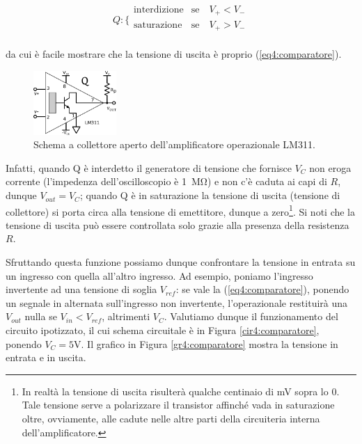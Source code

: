 \begin{equation}
Q : \bigg \{
\begin{array}{rl}
\mathrm{interdizione} & \mathrm{se} \quad V_+ < V_- \\
\mathrm{saturazione} & \mathrm{se} \quad V_+ > V_- \\
\end{array}
\label{eq4:comparatore_Q}
\end{equation}

da cui è facile mostrare che la tensione di uscita è proprio (\ref{eq4:comparatore}).

\begin{figure}
  \begin{center}
    \includegraphics[width=0.280\textwidth]{../E04/latex/c_LM311.pdf}
  \end{center}
  \caption{Schema a collettore aperto dell'amplificatore operazionale LM311.}
  \label{cir4:open_collector}
\end{figure}

Infatti, quando Q è interdetto il generatore di tensione che fornisce $V_C$ non eroga corrente (l'impedenza dell'oscilloscopio è \SI{1}{\Mohm}) e non c'è caduta ai capi di $R$, dunque $V_{out}=V_C$; quando Q è in saturazione la tensione di uscita (tensione di collettore) si porta circa alla tensione di emettitore, dunque a zero\footnote{In realtà la tensione di uscita risulterà qualche centinaio di \si{\milli\volt} sopra lo $0$. Tale tensione serve a polarizzare il transistor affinché vada in saturazione oltre, ovviamente, alle cadute nelle altre parti della circuiteria interna dell'amplificatore.}. Si noti che la tensione di uscita può essere controllata solo grazie alla presenza della resistenza $R$.

Sfruttando questa funzione possiamo dunque confrontare la tensione in entrata su un ingresso con quella all'altro ingresso. Ad esempio, poniamo l'ingresso invertente ad una tensione di soglia $V_{ref}$: se vale la (\ref{eq4:comparatore}), ponendo un segnale in alternata sull'ingresso non invertente, l'operazionale restituirà una $V_{out}$ nulla se $V_{in}<V_{ref}$, altrimenti $V_C$. Valutiamo dunque il funzionamento del circuito ipotizzato, il cui schema circuitale è in Figura \ref{cir4:comparatore}, ponendo $V_{C}=5$\si{\volt}. Il grafico in Figura \ref{gr4:comparatore} mostra la tensione in entrata e in uscita.

